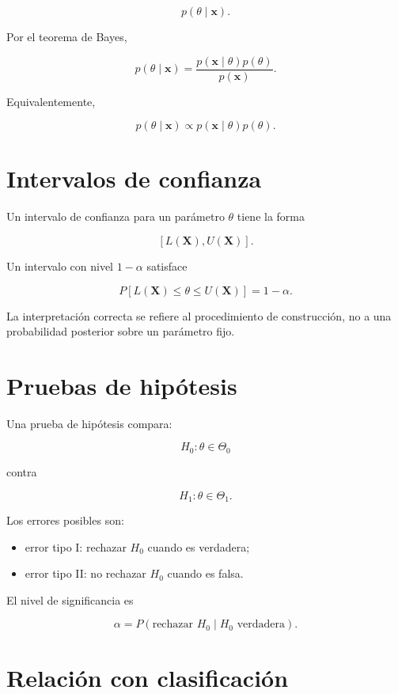 \documentclass[
  spanish,
  11pt,
  letterpaper,
  DIV=11,
  numbers=noendperiod]{scrreprt}
\providecommand{\tightlist}{%
  \setlength{\itemsep}{0pt}\setlength{\parskip}{0pt}}
\theoremstyle{definition}
\theoremstyle{plain}
\theoremstyle{definition}
\theoremstyle{remark}
\begin{document}
\[
p(\theta\mid\mathbf{x}).
\]

Por el teorema de Bayes,

\[
p(\theta\mid\mathbf{x})
=
\frac{
p(\mathbf{x}\mid\theta)p(\theta)
}{
p(\mathbf{x})
}.
\]

Equivalentemente,

\[
p(\theta\mid\mathbf{x})
\propto
p(\mathbf{x}\mid\theta)p(\theta).
\]

\section{Intervalos de confianza}\label{intervalos-de-confianza}

Un intervalo de confianza para un parámetro \(\theta\) tiene la forma

\[
[L(\mathbf{X}),U(\mathbf{X})].
\]

Un intervalo con nivel \(1-\alpha\) satisface

\[
P
\left[
L(\mathbf{X})
\leq
\theta
\leq
U(\mathbf{X})
\right]
=
1-\alpha.
\]

La interpretación correcta se refiere al procedimiento de construcción,
no a una probabilidad posterior sobre un parámetro fijo.

\section{Pruebas de hipótesis}\label{pruebas-de-hipuxf3tesis}

Una prueba de hipótesis compara:

\[
H_0:\theta\in\Theta_0
\]

contra

\[
H_1:\theta\in\Theta_1.
\]

Los errores posibles son:

\begin{itemize}
\tightlist
\item
  error tipo I: rechazar \(H_0\) cuando es verdadera;
\item
  error tipo II: no rechazar \(H_0\) cuando es falsa.
\end{itemize}

El nivel de significancia es

\[
\alpha
=
P(\text{rechazar }H_0\mid H_0\text{ verdadera}).
\]

\section{Relación con
clasificación}\label{relaciuxf3n-con-clasificaciuxf3n}
\end{document}
